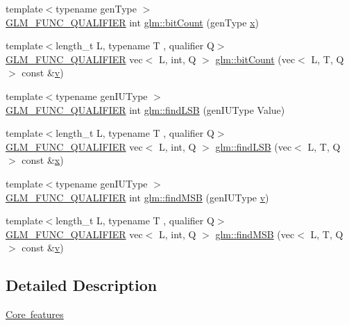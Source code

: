 \begin{DoxyCompactItemize}
\item 
{\footnotesize template$<$typename gen\+Type $>$ }\\\mbox{\hyperlink{setup_8hpp_a33fdea6f91c5f834105f7415e2a64407}{G\+L\+M\+\_\+\+F\+U\+N\+C\+\_\+\+Q\+U\+A\+L\+I\+F\+I\+ER}} int \mbox{\hyperlink{group__core__func__integer_ga44abfe3379e11cbd29425a843420d0d6}{glm\+::bit\+Count}} (gen\+Type \mbox{\hyperlink{_s_d_l__opengl_8h_ad0e63d0edcdbd3d79554076bf309fd47}{x}})
\item 
{\footnotesize template$<$length\+\_\+t L, typename T , qualifier Q$>$ }\\\mbox{\hyperlink{setup_8hpp_a33fdea6f91c5f834105f7415e2a64407}{G\+L\+M\+\_\+\+F\+U\+N\+C\+\_\+\+Q\+U\+A\+L\+I\+F\+I\+ER}} vec$<$ L, int, Q $>$ \mbox{\hyperlink{group__core__func__integer_gaac7b15e40bdea8d9aa4c4cb34049f7b5}{glm\+::bit\+Count}} (vec$<$ L, T, Q $>$ const \&\mbox{\hyperlink{_s_d_l__opengl_8h_a10a82eabcb59d2fcd74acee063775f90}{v}})
\item 
{\footnotesize template$<$typename gen\+I\+U\+Type $>$ }\\\mbox{\hyperlink{setup_8hpp_a33fdea6f91c5f834105f7415e2a64407}{G\+L\+M\+\_\+\+F\+U\+N\+C\+\_\+\+Q\+U\+A\+L\+I\+F\+I\+ER}} int \mbox{\hyperlink{group__core__func__integer_gaf74c4d969fa34ab8acb9d390f5ca5274}{glm\+::find\+L\+SB}} (gen\+I\+U\+Type Value)
\item 
{\footnotesize template$<$length\+\_\+t L, typename T , qualifier Q$>$ }\\\mbox{\hyperlink{setup_8hpp_a33fdea6f91c5f834105f7415e2a64407}{G\+L\+M\+\_\+\+F\+U\+N\+C\+\_\+\+Q\+U\+A\+L\+I\+F\+I\+ER}} vec$<$ L, int, Q $>$ \mbox{\hyperlink{group__core__func__integer_ga4454c0331d6369888c28ab677f4810c7}{glm\+::find\+L\+SB}} (vec$<$ L, T, Q $>$ const \&\mbox{\hyperlink{_s_d_l__opengl_8h_ad0e63d0edcdbd3d79554076bf309fd47}{x}})
\item 
{\footnotesize template$<$typename gen\+I\+U\+Type $>$ }\\\mbox{\hyperlink{setup_8hpp_a33fdea6f91c5f834105f7415e2a64407}{G\+L\+M\+\_\+\+F\+U\+N\+C\+\_\+\+Q\+U\+A\+L\+I\+F\+I\+ER}} int \mbox{\hyperlink{group__core__func__integer_ga7e4a794d766861c70bc961630f8ef621}{glm\+::find\+M\+SB}} (gen\+I\+U\+Type \mbox{\hyperlink{_s_d_l__opengl_8h_a10a82eabcb59d2fcd74acee063775f90}{v}})
\item 
{\footnotesize template$<$length\+\_\+t L, typename T , qualifier Q$>$ }\\\mbox{\hyperlink{setup_8hpp_a33fdea6f91c5f834105f7415e2a64407}{G\+L\+M\+\_\+\+F\+U\+N\+C\+\_\+\+Q\+U\+A\+L\+I\+F\+I\+ER}} vec$<$ L, int, Q $>$ \mbox{\hyperlink{group__core__func__integer_ga39ac4d52028bb6ab08db5ad6562c2872}{glm\+::find\+M\+SB}} (vec$<$ L, T, Q $>$ const \&\mbox{\hyperlink{_s_d_l__opengl_8h_a10a82eabcb59d2fcd74acee063775f90}{v}})
\end{DoxyCompactItemize}


\subsection{Detailed Description}
\mbox{\hyperlink{group__core}{Core features}} 